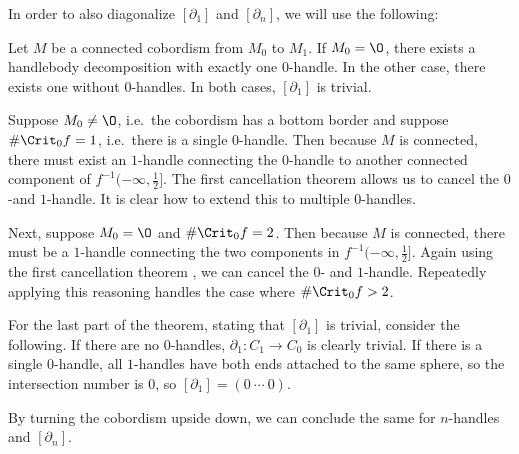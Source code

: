In order to also diagonalize $[\partial_1]$ and $[\partial_n]$, we will use the following:
\begin{theorem}
    Let $M$ be a connected cobordism from  $ M_0$ to $ M_1$.
    If $ M_0 = \O$, there exists a handlebody decomposition with exactly one $0$-handle. In the other case, there exists one without $0$-handles.
    In both cases, $[\partial_1]$ is trivial.
    \label{thm:no-zero}
\end{theorem}
\begin{marginfigure}
    \centering
    \caption{
        Assuming the manifold is connected, it cannot contain two zero handles without a one handle connecting them.
        We can then cancel the zero and one handle lowering the number of $0$-handles by $1$.
        Repeating this, we can find a handlebody decomposition with a minimal number of $0$-handles, that is, zero $0$-handles if $ M_0 \neq \O$, and one $0$-handles if $ M_0 = \O$.
    }
    \label{fig:without-zero-handles}
\end{marginfigure}
\begin{myproof}
    Suppose $M_0 \neq \O$, i.e.\ the cobordism has a bottom border and suppose $\# \Crit_0 f =1$, i.e.\ there is a single $0$-handle.
    Then because $M$ is connected, there must exist an $1$-handle connecting the $0$-handle to another connected component of $f^{-1}(-\infty, \frac{1}{2}]$.
    The first cancellation theorem allows us to cancel the $0$-and  $1$-handle.
    It is clear how to extend this to multiple $0$-handles.

    Next, suppose $M_0 = \O$ and $\# \Crit_0 f  = 2$. Then because $M$ is  connected, there must be a $1$-handle connecting the two components in $f^{-1}(-\infty, \frac{1}{2}]$. Again using the first cancellation theorem , we can cancel the $0$- and $1$-handle. Repeatedly applying this reasoning handles the case where $\# \Crit_0 f > 2$.

    For the last part of the theorem, stating that $[\partial_1]$ is trivial, consider the following. 
    If there are no  $0$-handles, $\partial_1: C_1 \to  C_0$ is clearly trivial.
    If there is a single $0$-handle, all $1$-handles have both ends attached to the same sphere, so the intersection number is $0$, so $[\partial_1] = (0 \ \cdots \ 0)$.
\end{myproof}
\begin{remark}
    By turning the cobordism upside down, we can conclude the same for $n$-handles and $[\partial_n]$.
\end{remark}

